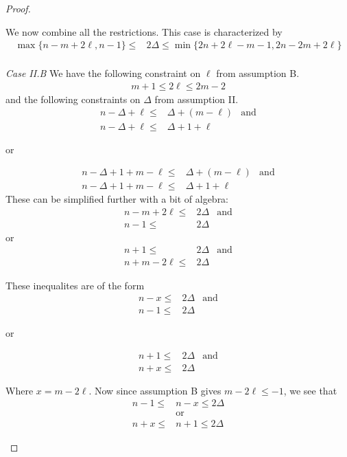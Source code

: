 \documentclass[letterpaper, 10pt]{article}
\begin{document}
\begin{proof}
\begin{proofpart}
We now combine all the restrictions. This case is characterized by
\begin{align*}
  \max\{ n -m + 2\ell, n-1 \} \leq & 2 \Delta \leq \min\{2n + 2\ell - m - 1, 2n - 2m + 2\ell \} \\
\end{align*}

\textit{Case II.B}  We have the following constraint on $\ell$ from
assumption B.
\begin{align*}
  m + 1 \leq 2 \ell \leq 2m - 2
\end{align*}
and the following constraints on $\Delta$ from assumption II.
\begin{align*}
  n - \Delta + \ell \leq & \Delta + (m - \ell) & \text{and} \\
  n - \Delta + \ell \leq & \Delta + 1 + \ell
\end{align*}
\begin{center}or\end{center}
\begin{align*}
n - \Delta + 1 + m - \ell \leq & \Delta + (m - \ell) & \text{and} \\
 n - \Delta + 1 + m - \ell \leq & \Delta + 1 + \ell
\end{align*}
These can be simplified further with a bit of algebra:
\begin{align*}
n-m+2\ell \leq & 2 \Delta & \text{and} \\
n-1 \leq & 2\Delta
\end{align*}
or
\begin{align*}
n+1 \leq & 2 \Delta & \text{and} \\
n+m-2\ell  \leq & 2 \Delta
\end{align*}

These inequalites are of the form
\begin{align*}
  n-x \leq & 2 \Delta & \text{and} \\
  n-1 \leq & 2\Delta
\end{align*}
\begin{center}or\end{center}
\begin{align*}
n + 1 \leq & 2 \Delta & \text{and} \\
n + x \leq & 2 \Delta
\end{align*}

Where $x = m -2\ell$. Now since assumption B gives $m - 2\ell \leq -1$, we
see that
\begin{align*}
  n-1 \leq & n-x \leq 2 \Delta \\
  &\text{or} \\
  n+x \leq & n+1 \leq 2 \Delta
\end{align*}


\end{proofpart}
\end{proof}
\end{document}

